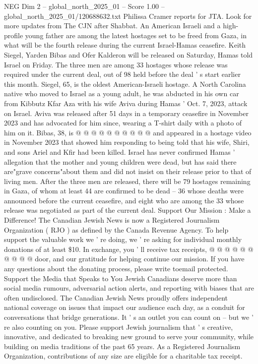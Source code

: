 \begin{textsample}{NEG Dim 2 – global\_north\_2025\_01 – Score 1.00 – global\_north\_2025\_01/120688632.txt}  \label{ex:f2_neg_053}
Philissa Cramer reports for JTA.
Look for more updates from The CJN after Shabbat.
An American Israeli and a high-profile young father are among the latest hostages set to be freed from Gaza, in what will be the fourth release during the current Israel-Hamas ceasefire.
Keith Siegel, Yarden Bibas and Ofer Kalderon will be released on Saturday, Hamas told Israel on Friday.
The three men are among 33 hostages whose release was required under the current deal, out of 98 held before the deal ' s start earlier this month.
Siegel, 65, is the oldest American-Israeli hostage.
A North Carolina native who moved to Israel as a young adult, he was abducted in his own car from Kibbutz Kfar Aza with his wife Aviva during Hamas ' Oct. 7, 2023, attack on Israel.
Aviva was released after 51 days in a temporary ceasefire in November 2023 and has advocated for him since, wearing a T-shirt daily with a photo of him on it.
Bibas, 38, is @ @ @ @ @ @ @ @ @ @ and appeared in a hostage video in November 2023 that showed him responding to being told that his wife, Shiri, and sons Ariel and Kfir had been killed.
Israel has never confirmed Hamas ' allegation that the mother and young children were dead, but has said there are"grave concerns"about them and did not insist on their release prior to that of living men.
After the three men are released, there will be 79 hostages remaining in Gaza, of whom at least 44 are confirmed to be dead -- 36 whose deaths were announced before the current ceasefire, and eight who are among the 33 whose release was negotiated as part of the current deal.
Support Our Mission : Make a Difference!
The Canadian Jewish News is now a Registered Journalism Organization ( RJO ) as defined by the Canada Revenue Agency.
To help support the valuable work we ' re doing, we ' re asking for individual monthly donations of at least \$10.
In exchange, you ' ll receive tax receipts, @ @ @ @ @ @ @ @ @ @ door, and our gratitude for helping continue our mission.
If you have any questions about the donating process, please write toemail protected.
Support the Media that Speaks to You Jewish Canadians deserve more than social media rumours, adversarial action alerts, and reporting with biases that are often undisclosed.
The Canadian Jewish News proudly offers independent national coverage on issues that impact our audience each day, as a conduit for conversations that bridge generations.
It ' s an outlet you can count on -- but we ' re also counting on you.
Please support Jewish journalism that ' s creative, innovative, and dedicated to breaking new ground to serve your community, while building on media traditions of the past 65 years.
As a Registered Journalism Organization, contributions of any size are eligible for a charitable tax receipt.

\end{textsample}
